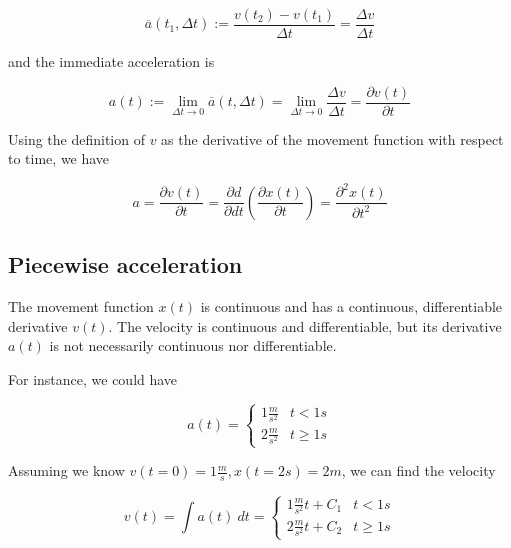 \documentclass[a4paper, 12pt]{article}
\begin{document}
\begin{equation*}
    \overline{a}(t_1, \Delta t) := \frac{v(t_2) - v(t_1)}{\Delta t} = \frac{\Delta v}{\Delta t}
\end{equation*}

and the immediate acceleration is 

\begin{equation*}
    a(t) := \lim_{\Delta t \to  0} \overline{a}(t, \Delta t) = \lim_{\Delta t \to  0} \frac{\Delta v}{\Delta t} = \frac{\partial v(t)}{\partial t}
\end{equation*}

Using the definition of $v$ as the derivative of the movement function with 
respect to time, we have 
 
\begin{equation*}
    a = \frac{\partial v(t)}{\partial t} = \frac{\partial d}{\partial dt} \left( \frac{\partial x(t)}{\partial t} \right) = \frac{\partial^2 x(t)}{\partial t^2}
\end{equation*}

\subsection{Piecewise acceleration}

The movement function $x(t)$ is continuous and has a continuous, differentiable 
derivative $v(t)$. The velocity is continuous and differentiable, but its 
derivative $a(t)$ is not necessarily continuous nor differentiable. 

For instance, we could have 

\begin{equation*}
    a(t) = \begin{cases}
        1 \frac{m}{s^2} & t < 1s \\ 
        2 \frac{m}{s^2} & t \geq 1s
    \end{cases}
\end{equation*}

Assuming we know $v(t = 0) = 1 \frac{m}{s}, x(t = 2 s) = 2m$,
we can find the velocity 

\begin{equation*}
    v(t) = \int a(t) ~ dt = \begin{cases}
        1 \frac{m}{s^2} t + C_1 & t < 1s \\ 
        2 \frac{m}{s^2} t + C_2 & t \geq 1 s
    \end{cases}
\end{equation*}
\end{document}
